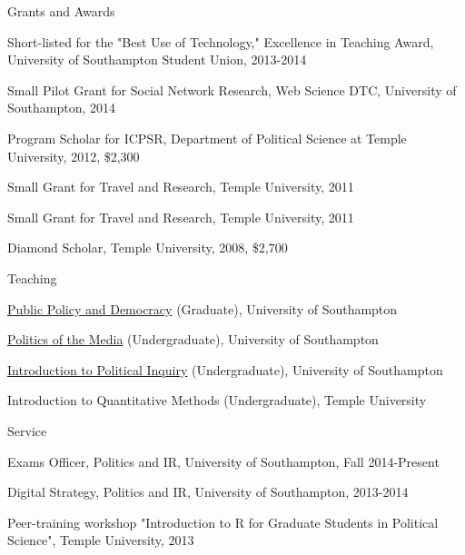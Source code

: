 \documentclass{resume} %
\begin{document}
\begin{rSection}{Grants and Awards}

\item Short-listed for the "Best Use of Technology," Excellence in Teaching Award, University of Southampton Student Union, 2013-2014    
\item Small Pilot Grant for Social Network Research, Web Science DTC, University of Southampton, 2014     
\item Program Scholar for ICPSR, Department of Political Science at Temple University, 2012, \$2,300    
\item Small Grant for Travel and Research, Temple University, 2011    
\item Small Grant for Travel and Research, Temple University, 2011   
\item Diamond Scholar, Temple University, 2008, \$2,700    

\end{rSection}



\begin{rSection}{Teaching}
\item \href{http://jmrphy.net/course\_public\_policy}{Public Policy and Democracy} (Graduate), University of Southampton           
\item \href{http://jmrphy.net/course\_media\_politics}{Politics of the Media} (Undergraduate), University of Southampton     
\item \href{http://jmrphy.net/political_inquiry}{Introduction to Political Inquiry} (Undergraduate), University of Southampton       
\item Introduction to Quantitative Methods (Undergraduate), Temple University               
\end{rSection}


\begin{rSection}{Service}
\item Exams Officer, Politics and IR, University of Southampton, Fall 2014-Present        
\item Digital Strategy, Politics and IR, University of Southampton, 2013-2014        
\item Peer-training workshop "Introduction to R for Graduate Students in Political Science", Temple University, 2013         
\end{rSection}
\end{document}
